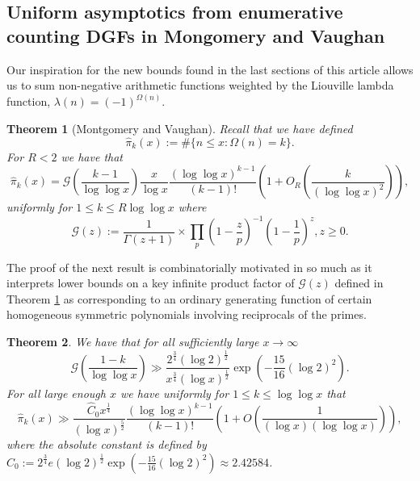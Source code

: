 \documentclass[11pt,reqno,a4letter]{article}
\numberwithin{figure}{section}
\numberwithin{table}{section}
\theoremstyle{plain}
\newtheorem{theorem}{Theorem}
\numberwithin{theorem}{section}
\theoremstyle{definition}
\begin{document}
\subsection{Uniform asymptotics from enumerative counting DGFs in Mongomery and Vaughan} 

Our inspiration for the new bounds found in the last sections of this article allows us to sum 
non-negative arithmetic functions weighted by the Liouville lambda function, 
$\lambda(n) = (-1)^{\Omega(n)}$. 

\begin{theorem}[Montgomery and Vaughan]
\label{theorem_HatPi_ExtInTermsOfGz} 
Recall that we have defined 
$$\widehat{\pi}_k(x) := \#\{n \leq x: \Omega(n)=k\}.$$ 
For $R < 2$ we have that 
\[
\widehat{\pi}_k(x) = \mathcal{G}\left(\frac{k-1}{\log\log x}\right) \frac{x}{\log x} 
     \frac{(\log\log x)^{k-1}}{(k-1)!} \left(1 + O_R\left(\frac{k}{(\log\log x)^2}\right)\right),  
\]
uniformly for $1 \leq k \leq R \log\log x$ where 
\[
\mathcal{G}(z) := \frac{1}{\Gamma(z+1)} \times 
     \prod_p \left(1-\frac{z}{p}\right)^{-1} \left(1-\frac{1}{p}\right)^z, z \geq 0. 
\]
\end{theorem} 

The proof of the next result is combinatorially motivated in so much as it interprets 
lower bounds on a key infinite product factor of $\mathcal{G}(z)$ defined in 
Theorem \ref{theorem_HatPi_ExtInTermsOfGz} 
as corresponding to an ordinary generating function of certain 
homogeneous symmetric polynomials involving reciprocals of the primes. 

\begin{theorem} 
\label{theorem_GFs_SymmFuncs_SumsOfRecipOfPowsOfPrimes} 
\label{cor_BoundsOnGz_FromMVBook_initial_stmt_v1} 
We have that for all sufficiently large $x \rightarrow \infty$ 
\[
\mathcal{G}\left(\frac{1-k}{\log\log x}\right) \gg 
     \frac{2^{\frac{3}{4}} (\log 2)^{\frac{1}{2}}}{x^{\frac{3}{4}} (\log x)^{\frac{1}{2}}} 
     \exp\left(-\frac{15}{16} (\log 2)^2\right). 
\]
For all large enough $x$ we have uniformly for $1 \leq k \leq \log\log x$ that 
\[
\widehat{\pi}_k(x) \gg \frac{\widehat{C}_0 x^{\frac{1}{4}}}{(\log x)^{\frac{5}{2}}} 
     \frac{(\log\log x)^{k-1}}{(k-1)!} \left(1 + 
     O\left(\frac{1}{(\log x) (\log\log x)}\right)\right), 
\]
where the absolute constant is defined by 
$\widehat{C}_0 := 2^{\frac{3}{4}} e (\log 2)^{\frac{1}{2}} 
 \exp\left(-\frac{15}{16} (\log 2)^2\right) \approx 2.42584$. 
\end{theorem} 
\end{document}

